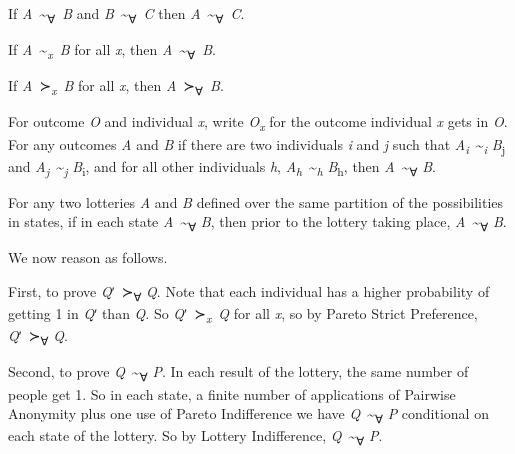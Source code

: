 \documentclass[
  letterpaper,
  DIV=11,
  numbers=noendperiod,
  oneside]{scrartcl}
\providecommand{\tightlist}{%
  \setlength{\itemsep}{0pt}\setlength{\parskip}{0pt}}
\begin{document}
\begin{description}
\tightlist
\item[Transitivity of Social Indifference]
If \emph{A}~\textasciitilde{}\textsubscript{∀}~\emph{B} and
\emph{B}~\textasciitilde{}\textsubscript{∀}~\emph{C} then
\emph{A}~\textasciitilde{}\textsubscript{∀}~\emph{C}.
\item[Pareto Indifference]
If \emph{A}~\textasciitilde{}\textsubscript{\emph{x}}~\emph{B} for all
\emph{x}, then \emph{A}~\textasciitilde{}\textsubscript{∀}~\emph{B}.
\item[Pareto Strict Preference]
If \emph{A}~≻\textsubscript{\emph{x}}~\emph{B} for all \emph{x}, then
\emph{A}~≻\textsubscript{∀}~\emph{B}.
\item[Pairwise Anonymity]
For outcome \emph{O} and individual \emph{x}, write
\emph{O\textsubscript{x}} for the outcome individual \emph{x} gets in
\emph{O}. For any outcomes \emph{A} and \emph{B} if there are two
individuals \emph{i} and \emph{j} such that
\emph{A\textsubscript{i}}~\textasciitilde{}\textsubscript{\emph{i}}
\emph{B}\textsubscript{j} and
\emph{A\textsubscript{j}}~\textasciitilde{}\textsubscript{\emph{j}}
\emph{B}\textsubscript{i}, and for all other individuals \emph{h},
\emph{A\textsubscript{h}}~\textasciitilde{}\textsubscript{\emph{h}}
\emph{B}\textsubscript{h}, then
\emph{A}~\textasciitilde{}\textsubscript{∀} \emph{B}.
\item[Lottery Indifference]
For any two lotteries \emph{A} and \emph{B} defined over the same
partition of the possibilities in states, if in each state
\emph{A}~\textasciitilde{}\textsubscript{∀} \emph{B}, then prior to the
lottery taking place, \emph{A}~\textasciitilde{}\textsubscript{∀}
\emph{B}.
\end{description}

We now reason as follows.

First, to prove \emph{Q}ʹ~≻\textsubscript{∀} \emph{Q}. Note that each
individual has a higher probability of getting 1 in \emph{Q}ʹ than
\emph{Q}. So \emph{Q}ʹ~≻\textsubscript{\emph{x}}~\emph{Q} for all
\emph{x}, so by Pareto Strict Preference, \emph{Q}ʹ~≻\textsubscript{∀}
\emph{Q}.

Second, to prove \emph{Q}~\textasciitilde{}\textsubscript{∀} \emph{P}.
In each result of the lottery, the same number of people get 1. So in
each state, a finite number of applications of Pairwise Anonymity plus
one use of Pareto Indifference we have
\emph{Q}~\textasciitilde{}\textsubscript{∀} \emph{P} conditional on each
state of the lottery. So by Lottery Indifference,
\emph{Q}~\textasciitilde{}\textsubscript{∀} \emph{P}.
\end{document}

